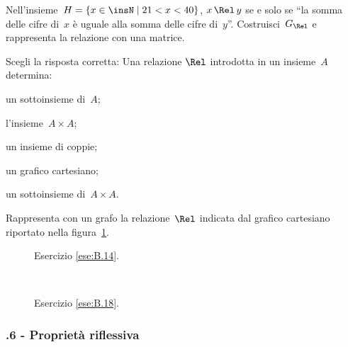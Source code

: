 \begin{multicols}{2}
\begin{esercizio}
\label{ese:B.16}
Nell'insieme~$H = \{ x \in \insN \mid  21 < x < 40 \}$, $x \,\Rel\, y$ se e solo se ``la somma delle cifre di~$x$ è uguale alla somma delle cifre di~$y$''.
Costruisci~$G_\Rel$ e rappresenta la relazione con una matrice.
\end{esercizio}

\begin{esercizio}
\label{ese:B.17}
Scegli la risposta corretta:
Una relazione $\Rel$ introdotta in un insieme~$A$ determina:
\begin{enumeratea}
 \item un sottoinsieme di~$A$;
 \item l'insieme~$A \times A$;
 \item un insieme di coppie;
 \item un grafico cartesiano;
 \item un sottoinsieme di~$A \times A$.
 \end{enumeratea}
\end{esercizio}

\begin{esercizio}
\label{ese:B.18}
Rappresenta con un grafo la relazione~$\Rel$ indicata dal grafico cartesiano riportato nella figura~\ref{fig:B.16}.
\end{esercizio}
\end{multicols}

\begin{figure}[t]
\begin{minipage}[b]{.69\textwidth}
 \centering
 
 \caption{Esercizio \ref{ese:B.14}.}\label{fig:B.15}
\end{minipage}\
\begin{minipage}[b]{.3\textwidth}
 \centering
 
 \caption{Esercizio \ref{ese:B.18}.}\label{fig:B.16}
\end{minipage}
\end{figure}
\pagebreak

\subsubsection*{\thechapter.6 - Proprietà riflessiva}

